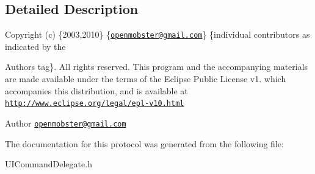 \subsection{\-Detailed \-Description}
\-Copyright (c) \{2003,2010\} \{\href{mailto:openmobster@gmail.com}{\tt openmobster@gmail.\-com}\} \{individual contributors as indicated by the \begin{DoxyAuthor}{\-Authors}
tag\}. \-All rights reserved. \-This program and the accompanying materials are made available under the terms of the \-Eclipse \-Public \-License v1. which accompanies this distribution, and is available at \href{http://www.eclipse.org/legal/epl-v10.html}{\tt http\-://www.\-eclipse.\-org/legal/epl-\/v10.\-html}
\end{DoxyAuthor}
\begin{DoxyAuthor}{\-Author}
\href{mailto:openmobster@gmail.com}{\tt openmobster@gmail.\-com} 
\end{DoxyAuthor}


\-The documentation for this protocol was generated from the following file\-:\begin{DoxyCompactItemize}
\item 
\-U\-I\-Command\-Delegate.\-h\end{DoxyCompactItemize}
